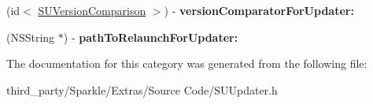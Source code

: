 \begin{DoxyCompactItemize}
\mbox{\label{category_n_s_object_07_s_u_updater_delegate_informal_protocol_08_a6132786a2076a95449444d18ab0c7d8a}} 
(id$<$ \mbox{\hyperlink{protocol_s_u_version_comparison-p}{S\+U\+Version\+Comparison}} $>$) -\/ {\bfseries version\+Comparator\+For\+Updater\+:}
\item 
\mbox{\label{category_n_s_object_07_s_u_updater_delegate_informal_protocol_08_aa0f9678cfdbb8adf42738f8df7904a31}} 
(N\+S\+String $\ast$) -\/ {\bfseries path\+To\+Relaunch\+For\+Updater\+:}
\end{DoxyCompactItemize}


The documentation for this category was generated from the following file\+:\begin{DoxyCompactItemize}
\item 
third\+\_\+party/\+Sparkle/\+Extras/\+Source Code/S\+U\+Updater.\+h\end{DoxyCompactItemize}
